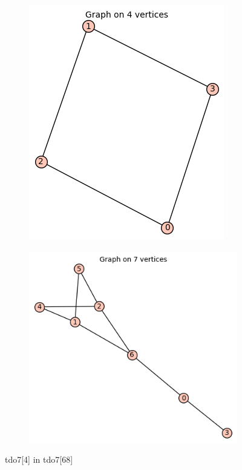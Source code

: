 \documentclass[12pt, a4paper]{article}
\begin{document}
\begin{center}
\begin{figure}[!htb]
\centering
\begin{subfigure}{0.5\textwidth}
  \centering
  \includegraphics[width=0.4\linewidth]{tdo7[4]}
\end{subfigure}%
\begin{subfigure}{0.5\textwidth}
  \centering
  \includegraphics[width=0.5\linewidth]{tdo7[68]}
\end{subfigure}
\caption{tdo7[4] in tdo7[68]}
\label{fig:test}
\end{figure}


\end{center}
\end{document}
